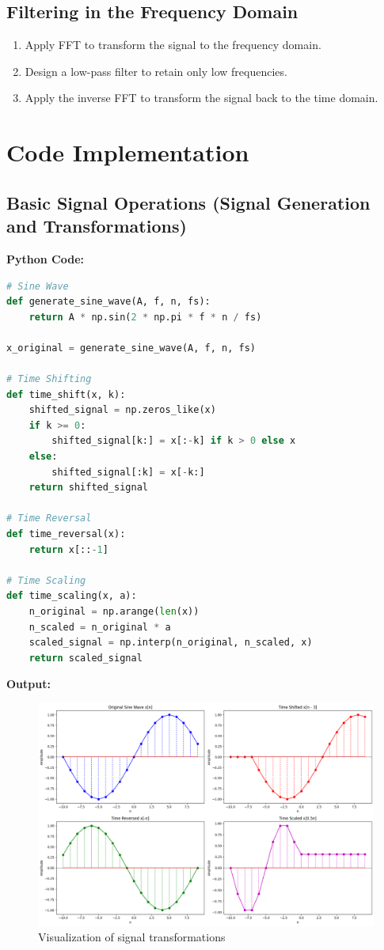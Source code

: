 \documentclass[a4paper,12pt]{article}
\begin{document}
\subsection*{Filtering in the Frequency Domain}
\begin{enumerate}
    \item Apply FFT to transform the signal to the frequency domain.
    \item Design a low-pass filter to retain only low frequencies.
    \item Apply the inverse FFT to transform the signal back to the time domain.
\end{enumerate}

\section*{Code Implementation}
\subsection*{Basic Signal Operations (Signal Generation and Transformations)}
\textbf{Python Code:}
\begin{lstlisting}[language=Python, caption=Signal Generation and Transformations]
# Sine Wave
def generate_sine_wave(A, f, n, fs):
    return A * np.sin(2 * np.pi * f * n / fs)

x_original = generate_sine_wave(A, f, n, fs)

# Time Shifting
def time_shift(x, k):
    shifted_signal = np.zeros_like(x)
    if k >= 0:
        shifted_signal[k:] = x[:-k] if k > 0 else x
    else:
        shifted_signal[:k] = x[-k:]
    return shifted_signal

# Time Reversal
def time_reversal(x):
    return x[::-1]

# Time Scaling
def time_scaling(x, a):
    n_original = np.arange(len(x))
    n_scaled = n_original * a
    scaled_signal = np.interp(n_original, n_scaled, x)
    return scaled_signal    
\end{lstlisting}

\textbf{Output:}
\begin{figure}[H]
    \centering
    \includegraphics[width=0.8\linewidth]{2.png}
    \caption{Visualization of signal transformations}
    \label{fig:signal_transform}
\end{figure}
\end{document}
